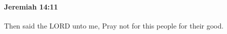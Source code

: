 
		\paragraph{Jeremiah 14:11} %
			\label{JEREMIAH-14-11}

			Then said the LORD unto me, Pray not for this people for their good.


